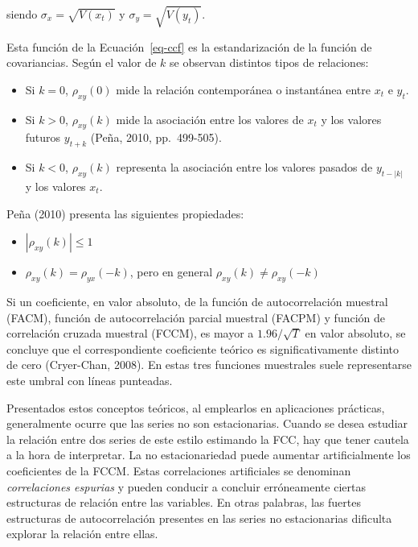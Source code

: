 \documentclass[12pt]{article}
\providecommand{\tightlist}{%
  \setlength{\itemsep}{0pt}\setlength{\parskip}{0pt}}\usepackage{longtable,booktabs,array}
\begin{document}
siendo \(\sigma_x = \sqrt{V(x_t)}\) y \(\sigma_y = \sqrt{V(y_t)}\).

Esta función de la Ecuación~\ref{eq-ccf} es la estandarización de la
función de covariancias. Según el valor de \(k\) se observan distintos
tipos de relaciones:

\begin{itemize}
\tightlist
\item
  Si \(k=0\), \(\rho_{xy}(0)\) mide la relación contemporánea o
  instantánea entre \(x_t\) e \(y_{t}\).
\item
  Si \(k>0\), \(\rho_{xy}(k)\) mide la asociación entre los valores de
  \(x_t\) y los valores futuros \(y_{t+k}\) (Peña, 2010, pp.~499-505).
\item
  Si \(k<0\), \(\rho_{xy}(k)\) representa la asociación entre los
  valores pasados de \(y_{t-|k|}\) y los valores \(x_{t}\).
\end{itemize}

Peña (2010) presenta las siguientes propiedades:

\begin{itemize}
\tightlist
\item
  \(|\rho_{xy}(k)| \leq 1\)
\item
  \(\rho_{xy}(k) = \rho_{yx}(-k)\), pero en general
  \(\rho_{xy}(k) \neq \rho_{xy}(-k)\)
\end{itemize}

Si un coeficiente, en valor absoluto, de la función de autocorrelación
muestral (FACM), función de autocorrelación parcial muestral (FACPM) y
función de correlación cruzada muestral (FCCM), es mayor a
\(1.96/\sqrt{T}\) en valor absoluto, se concluye que el correspondiente
coeficiente teórico es significativamente distinto de cero (Cryer-Chan,
2008). En estas tres funciones muestrales suele representarse este
umbral con líneas punteadas.

Presentados estos conceptos teóricos, al emplearlos en aplicaciones
prácticas, generalmente ocurre que las series no son estacionarias.
Cuando se desea estudiar la relación entre dos series de este estilo
estimando la FCC, hay que tener cautela a la hora de interpretar. La no
estacionariedad puede aumentar artificialmente los coeficientes de la
FCCM. Estas correlaciones artificiales se denominan \emph{correlaciones
espurias} y pueden conducir a concluir erróneamente ciertas estructuras
de relación entre las variables. En otras palabras, las fuertes
estructuras de autocorrelación presentes en las series no estacionarias
dificulta explorar la relación entre ellas.
\end{document}
